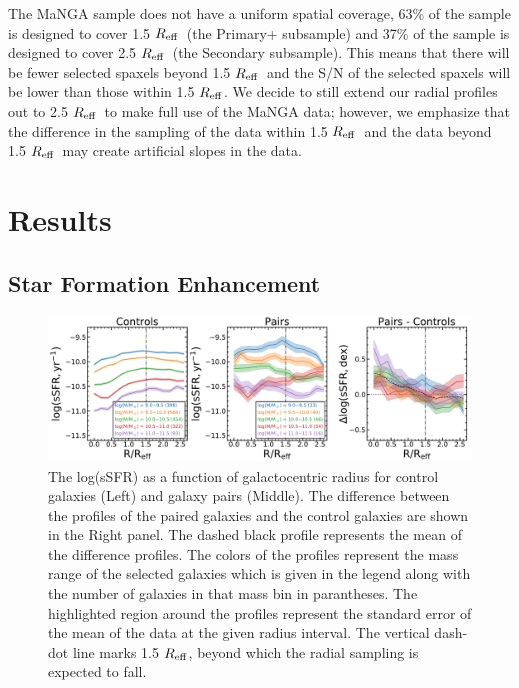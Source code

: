 \documentclass[apj,twocolumn]{emulateapj}
\newcommand{\reff}{$R_{\rm eff}$}
\begin{document}
\begin{CJK*}{UTF8}{gbsn}
The MaNGA sample does not have a uniform spatial coverage, 63\% of the sample is designed to cover 1.5 \reff\ (the Primary+ subsample) and 37\% of the sample is designed to cover 2.5 \reff\ (the Secondary subsample). This means that there will be fewer selected spaxels beyond 1.5 \reff\ and the S/N of the selected spaxels will be lower than those within 1.5 \reff. We decide to still extend our radial profiles out to 2.5 \reff\ to make full use of the MaNGA data; however, we emphasize that the difference in the sampling of the data within 1.5 \reff\ and the data beyond 1.5 \reff\ may create artificial slopes in the data.


\section{Results}\label{sec:results}

\subsection{Star Formation Enhancement}

\begin{figure}
\centering
\includegraphics[width=\linewidth]{ssfr_comb.pdf}
\caption[]{The log(sSFR) as a function of galactocentric radius for control galaxies (Left) and galaxy pairs (Middle). The difference between the profiles of the paired galaxies and the control galaxies are shown in the Right panel. The dashed black profile represents the mean of the difference profiles. The colors of the profiles represent the mass range of the selected galaxies which is given in the legend along with the number of galaxies in that mass bin in parantheses. The highlighted region around the profiles represent the standard error of the mean of the data at the given radius interval. The vertical dash-dot line marks 1.5 \reff, beyond which the radial sampling is expected to fall.}
\label{fig:ssfr_prof}
\end{figure}


\end{CJK*}
\end{document}
